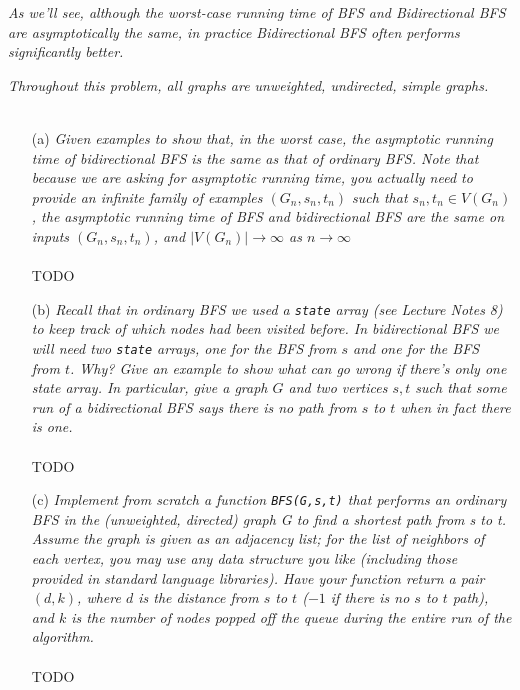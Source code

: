 \documentclass[12pt]{article} \setlength{\oddsidemargin}{0in}
\begin{document}
\textit{As we’ll see, although the worst-case running time of BFS and Bidirectional BFS are
asymptotically the same, in practice Bidirectional BFS often performs significantly
better.}

\textit{Throughout this problem, all graphs are unweighted, undirected, simple graphs.}
\\\\

\begin{enumerate}
\item[(a)]{\textit{Given examples to show that, in the worst case, the asymptotic running time of
bidirectional BFS is the same as that of ordinary BFS. Note that because we are
asking for asymptotic running time, you actually need to provide an infinite family
of examples $(G_n , s_n , t_n )$ such that $s_n, t_n \in V(G_n)$, the asymptotic running time of
BFS and bidirectional BFS are the same on inputs $(G_n, s_n, t_n)$, and $|V(G_n)| \rightarrow \infty$ as $n \rightarrow \infty$}}
  \\\\
  TODO
  \\
\item[(b)]{\textit{Recall that in ordinary BFS we used a \texttt{state} array (see Lecture Notes 8) to keep track of which nodes had been visited before. In bidirectional BFS we will need two
\texttt{state} arrays, one for the BFS from $s$ and one for the BFS from $t$. Why? Give an
example to show what can go wrong if there’s only one state array. In particular,
give a graph $G$ and two vertices $s, t$ such that some run of a bidirectional BFS
says there is no path from $s$ to $t$ when in fact there is one.}}
  \\\\
  TODO
  \\
  \item[(c)]{\textit{Implement from scratch a function \texttt{BFS(G,s,t)} that performs an ordinary BFS in the (unweighted, directed) graph G to find a shortest path from s to t. Assume
the graph is given as an adjacency list; for the list of neighbors of each vertex,
you may use any data structure you like (including those provided in standard
language libraries). Have your function return a pair $(d, k)$, where $d$ is the distance
from $s$ to $t$ ($-1$ if there is no $s$ to $t$ path), and $k$ is the number of nodes popped
off the queue during the entire run of the algorithm.}}
  \\\\
  TODO
  \\

\end{enumerate}
\end{document}
